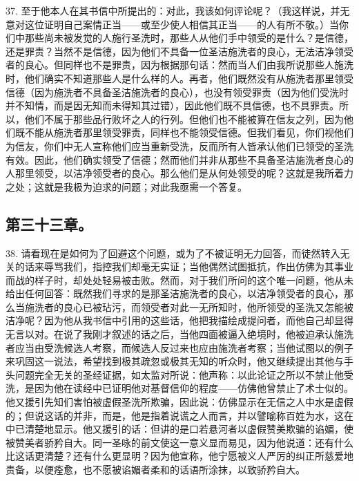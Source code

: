 37. 至于他本人在其书信中所提出的：对此，我该如何评论呢？（我这样说，并无意对这位证明自己案情正当——或至少使人相信其正当——的人有所不敬。）当你们中那些尚未被发觉的人施行圣洗时，那些人从他们手中领受的是什么？是信德，还是罪责？当然不是信德，因为他们不具备一位圣洁施洗者的良心，无法洁净领受者的良心。但同样也不是罪责，因为根据那句话：然而当人们由我所说那些人施洗时，他们确实不知道那些人是什么样的人。再者，他们既然没有从施洗者那里领受信德（因为施洗者不具备圣洁施洗者的良心），也没有领受罪责（因为他们受洗时并不知情，而是因无知而未得知其过错），因此他们既不具信德，也不具罪责。所以，他们不属于那些品行败坏之人的行列。但他们也不能被算在信友之列，因为他们既不能从施洗者那里领受罪责，同样也不能领受信德。但我们看见，你们视他们为信友，你们中无人宣称他们应当重新受洗，反而所有人皆承认他们已领受的圣洗有效。因此，他们确实领受了信德；然而他们并非从那些不具备圣洁施洗者良心的人那里领受，以洁净领受者的良心。那么他们是从何处领受的呢？这就是我所着力之处；这就是我极为迫求的问题；对此我亟需一个答复。\par


\subsection{第三十三章。}

38. 请看现在是如何为了回避这个问题，或为了不被证明无力回答，而徒然转入无关的话来辱骂我们，指控我们却毫无实证；当他偶然试图抵抗，作出仿佛为其事业而战的样子时，却处处轻易被击败。然而，对于我们所问的这个唯一问题，他从未给出任何回答：既然我们寻求的是那圣洁施洗者的良心，以洁净领受者的良心，那么当施洗者的良心已被玷污，而领受者对此一无所知时，他所领受的圣洗又怎能被洁净呢？因为他从我书信中引用的这些话，他把我描绘成提问者，而他自己却显得无言以对。在说了我刚才叙述的话之后，当他四面被逼入绝境时，他被迫承认施洗者应当由受洗候选人考察，而候选人反过来也应由施洗者考察；当他试图以的例子来巩固这一说法，希望找到极其疏忽或极其无知的听众时，他又继续提出其他与手头问题完全无关的圣经证据，如太监对所说：他声称：以此论证之所以不禁止他受洗，是因为他在读经中已证明他对基督信仰的程度——仿佛他曾禁止了术士似的。他又援引先知们害怕被虚假圣洗所欺骗，因此说：仿佛显示在无信之人中水是虚假的；但说这话的并非，而是，他是指着说谎之人而言，并以譬喻称百姓为水，这在中已清楚地显示。他又援引的话：但讲的是口若悬河者以虚假赞美欺骗的谄媚，使被赞美者骄矜自大。同一圣咏的前文使这一意义显而易见，因为他说道：还有什么比这话更清楚？还有什么更显明？因为他宣称，他宁愿被义人严厉的纠正所慈爱地责备，以便痊愈，也不愿被谄媚者柔和的话语所涂抹，以致骄矜自大。\par

